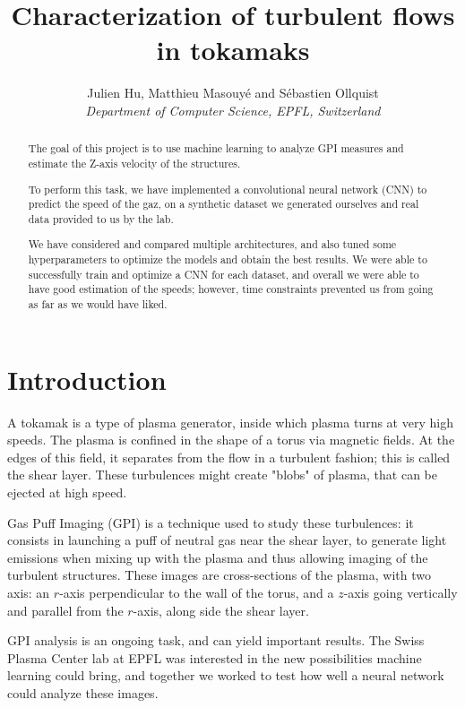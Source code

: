 \documentclass[10pt,conference]{IEEEtran}
\begin{document}
\title{Characterization of turbulent flows in tokamaks}

\author{
  Julien Hu, Matthieu Masouyé and Sébastien Ollquist\\
  \textit{Department of Computer Science, EPFL, Switzerland}
}

\maketitle
\thispagestyle{plain}
\pagestyle{plain}

\begin{abstract}
    The goal of this project is to use machine learning to analyze GPI measures and estimate the Z-axis velocity of the structures.\par 
    To perform this task, we have implemented a convolutional neural network (CNN) to predict the speed of the gaz, on a synthetic dataset we generated ourselves and real data provided to us by the lab.\par
    We have considered and compared multiple architectures, and also tuned some hyperparameters to optimize the models and obtain the best results.
    We were able to successfully train and optimize a CNN for each dataset, and overall we were able to have good estimation of the speeds; however, time constraints prevented us from going as far as we would have liked.
\end{abstract}

\section{Introduction}
A tokamak is a type of plasma generator, inside which plasma turns at very high speeds. The plasma is confined in the shape of a torus via magnetic fields. At the edges of this field, it separates from the flow in a turbulent fashion; this is called the shear layer. These turbulences might create "blobs" of plasma, that can be ejected at high speed.\par 
Gas Puff Imaging (GPI) is a technique used to study these turbulences: it consists in launching a puff of neutral gas near the shear layer, to generate light emissions when mixing up with the plasma and thus allowing imaging of the turbulent structures. These images are cross-sections of the plasma, with two axis: an $r$-axis perpendicular to the wall of the torus, and a $z$-axis going vertically and parallel from the $r$-axis, along side the shear layer.\par
GPI analysis is an ongoing task, and can yield important results. The Swiss Plasma Center lab at EPFL was interested in the new possibilities machine learning could bring, and together we worked to test how well a neural network could analyze these images.\par
 
\end{document}

